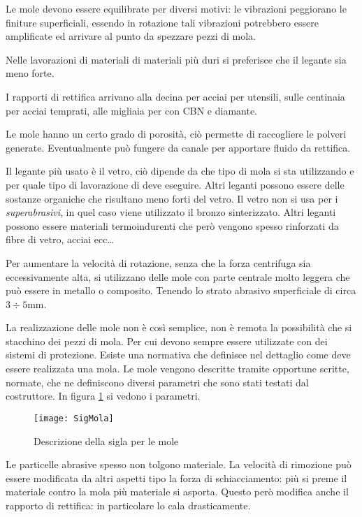Le mole devono essere equilibrate per diversi motivi: le vibrazioni peggiorano le finiture superficiali, essendo in rotazione tali vibrazioni potrebbero essere amplificate ed arrivare al punto da spezzare pezzi di mola.

Nelle lavorazioni di materiali di materiali più duri si preferisce che il legante sia meno forte.

I rapporti di rettifica arrivano alla decina per acciai per utensili, sulle centinaia per acciai temprati, alle migliaia per con CBN e diamante.

Le mole hanno un certo grado di porosità, ciò permette di raccogliere le polveri generate. Eventualmente può fungere da canale per apportare fluido da rettifica.

Il legante più usato è il vetro, ciò dipende da che tipo di mola si sta utilizzando e per quale tipo di lavorazione di deve eseguire.
Altri leganti possono essere delle sostanze organiche che risultano meno forti del vetro.
Il vetro non si usa per i \textit{superabrasivi}, in quel caso viene utilizzato il bronzo sinterizzato.
Altri leganti possono essere materiali termoindurenti che però vengono spesso rinforzati da fibre di vetro, acciai ecc\dots

Per aumentare la velocità di rotazione, senza che la forza centrifuga sia eccessivamente alta, si utilizzano delle mole con parte centrale molto leggera che può essere in metallo o composito. Tenendo lo strato abrasivo superficiale di circa $3\div 5\unit{\mm}$.

La realizzazione delle mole non è così semplice, non è remota la possibilità che si stacchino dei pezzi di mola. Per cui devono sempre essere utilizzate con dei sistemi di protezione.
Esiste una normativa che definisce nel dettaglio come deve essere realizzata una mola.
Le mole vengono descritte tramite opportune scritte, normate, che ne definiscono diversi parametri che sono stati testati dal costruttore.
In figura \ref{fig:SigMola} si vedono i parametri.

\begin{figure}
\centering
\texttt{[image: SigMola]}
\caption{Descrizione della sigla per le mole}
\label{fig:SigMola}
\end{figure}

Le particelle abrasive spesso non tolgono materiale. La velocità di rimozione può essere modificata da altri aspetti tipo la forza di schiacciamento: più si preme il materiale contro la mola più materiale si asporta. Questo però modifica anche il rapporto di rettifica: in particolare lo cala drasticamente.

